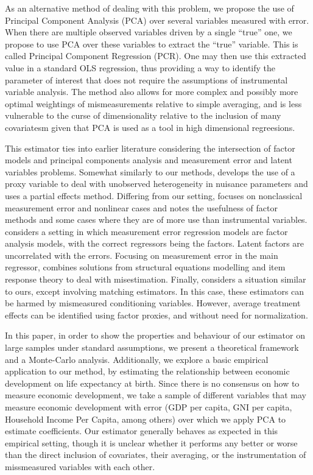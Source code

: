 \documentclass[10pt]{article}
\begin{document}
        As an alternative method of dealing with this problem, we propose the use of Principal Component Analysis (PCA) over several variables measured with error. When there are multiple observed variables driven by a single ``true'' one, we propose to use PCA over these variables to extract the ``true'' variable. This is called Principal Component Regression (PCR). One may then use this extracted value in a standard OLS regression, thus providing a way to identify the parameter of interest that does not require the assumptions of instrumental variable analysis. The method also allows for more complex and possibly more optimal weightings of mismeasurements relative to simple averaging, and is less vulnerable to the curse of dimensionality relative to the inclusion of many covariatesm given that PCA is used as a tool in high dimensional regreesions.

        This estimator ties into earlier literature considering the intersection of factor models and principal components analysis and measurement error and latent variables problems. Somewhat similarly to our methods, \cite{nagasawa_identication_2020} develops the use of a proxy variable to deal with unobserved heterogeneity in nuisance parameters and uses a partial effects method. Differing from our setting, \cite{schennach_recent_2016} focuses on nonclassical measurement error and nonlinear cases and notes the usefulness of factor methods and some cases where they are of more use than instrumental variables. \cite{wegge_local_1996} considers a setting in which measurement error regression models are factor analysis models, with the correct regressors being the factors. Latent factors are uncorrelated with the errors. Focusing on measurement error in the main regressor, \cite{schofield_correcting_2015} combines solutions from structural equations modelling and item response theory to deal with misestimation. Finally, \cite{heckman_matching_2010} considers a situation similar to ours, except involving matching estimators. In this case, these estimators can be harmed by mismeasured conditioning variables. However, average treatment effects can be identified using factor proxies, and without need for normalization.

        In this paper, in order to show the properties and behaviour of our estimator on large samples under standard assumptions, we present a theoretical framework and a Monte-Carlo analysis. Additionally, we explore a basic empirical application to our method, by estimating the relationship between economic development on life expectancy at birth. Since there is no consensus on how to measure economic development, we take a sample of different variables that may measure economic development with error (GDP per capita, GNI per capita, Household Income Per Capita, among others) over which we apply PCA to estimate coefficients. Our estimator generally behaves as expected in this empirical setting, though it is unclear whether it performs any better or worse than the direct inclusion of covariates, their averaging, or the instrumentation of missmeasured variables with each other.
\end{document}

